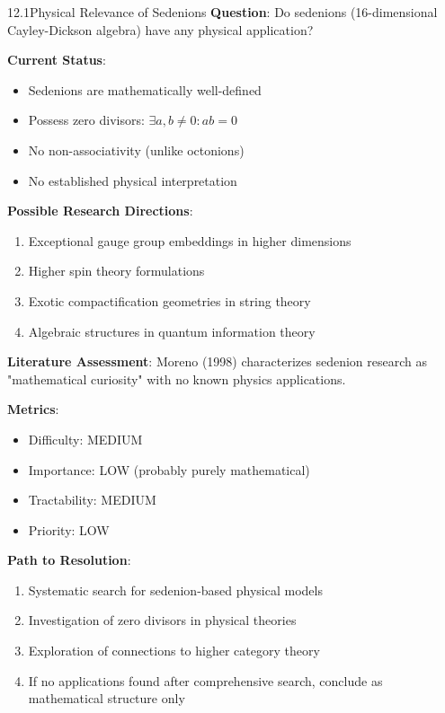 \begin{openproblem}{12.1}{Physical Relevance of Sedenions}
\textbf{Question}: Do sedenions (16-dimensional Cayley-Dickson algebra) have any physical application?

\textbf{Current Status}:
\begin{itemize}
    \item Sedenions are mathematically well-defined
    \item Possess zero divisors: $\exists a, b \neq 0 : ab = 0$
    \item No non-associativity (unlike octonions)
    \item No established physical interpretation
\end{itemize}

\textbf{Possible Research Directions}:
\begin{enumerate}
    \item Exceptional gauge group embeddings in higher dimensions
    \item Higher spin theory formulations
    \item Exotic compactification geometries in string theory
    \item Algebraic structures in quantum information theory
\end{enumerate}

\textbf{Literature Assessment}: Moreno (1998) \cite{moreno1998zeros} characterizes sedenion research as "mathematical curiosity" with no known physics applications.

\textbf{Metrics}:
\begin{itemize}
    \item Difficulty: MEDIUM
    \item Importance: LOW (probably purely mathematical)
    \item Tractability: MEDIUM
    \item Priority: LOW
\end{itemize}

\textbf{Path to Resolution}:
\begin{enumerate}
    \item Systematic search for sedenion-based physical models
    \item Investigation of zero divisors in physical theories
    \item Exploration of connections to higher category theory
    \item If no applications found after comprehensive search, conclude as mathematical structure only
\end{enumerate}
\end{openproblem}

